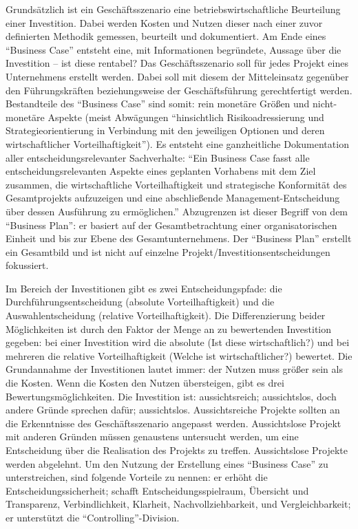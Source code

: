 Grundsätzlich ist ein Geschäftsszenario eine betriebswirtschaftliche Beurteilung einer Investition. Dabei werden Kosten und Nutzen dieser nach einer zuvor definierten Methodik gemessen, beurteilt und dokumentiert. Am Ende eines \enquote{Business Case} entsteht eine, mit Informationen begründete, Aussage über die Investition -- ist diese rentabel? Das Geschäftsszenario soll für jedes Projekt eines Unternehmens erstellt werden. Dabei soll mit diesem der Mitteleinsatz gegenüber den Führungskräften beziehungsweise der Geschäftsführung gerechtfertigt werden. Bestandteile des \enquote{Business Case} sind somit: rein monetäre Größen und nicht-monetäre Aspekte (meist Abwägungen \enquote{hinsichtlich Risikoadressierung und Strategieorientierung in Verbindung mit den jeweiligen Optionen und deren wirtschaftlicher Vorteilhaftigkeit}\autocite[][S.12]{brugger_it_2009}). Es entsteht eine ganzheitliche Dokumentation aller entscheidungsrelevanter Sachverhalte: \enquote{Ein Business Case fasst alle entscheidungsrelevanten Aspekte eines geplanten Vorhabens mit dem Ziel zusammen, die wirtschaftliche Vorteilhaftigkeit und strategische Konformität des Gesamtprojekts aufzuzeigen und eine abschließende Management-Entscheidung über dessen Ausführung zu ermöglichen.}\autocite[][S.13]{brugger_it_2009} Abzugrenzen ist dieser Begriff von dem \enquote{Business Plan}: er basiert auf der Gesamtbetrachtung einer organisatorischen Einheit und bis zur Ebene des Gesamtunternehmens. Der \enquote{Business Plan} erstellt ein Gesamtbild und ist nicht auf einzelne Projekt/Investitionsentscheidungen fokussiert. 
\par
Im Bereich der Investitionen gibt es zwei Entscheidungspfade: die Durchführungsentscheidung (absolute Vorteilhaftigkeit) und die Auswahlentscheidung (relative Vorteilhaftigkeit).\autocite[vgl.][S.14]{brugger_it_2009} Die Differenzierung beider Möglichkeiten ist durch den Faktor der Menge an zu bewertenden Investition gegeben: bei einer Investition wird die absolute (Ist diese wirtschaftlich?) und bei mehreren die relative Vorteilhaftigkeit (Welche ist wirtschaftlicher?) bewertet. Die Grundannahme der Investitionen lautet immer: der Nutzen muss größer sein als die Kosten. Wenn die Kosten den Nutzen übersteigen, gibt es drei Bewertungsmöglichkeiten. Die Investition ist: aussichtsreich; aussichtslos, doch andere Gründe sprechen dafür; aussichtslos. Aussichtsreiche Projekte sollten an die Erkenntnisse des Geschäftsszenario angepasst werden. Aussichtslose Projekt mit anderen Gründen müssen genaustens untersucht werden, um eine Entscheidung über die Realisation des Projekts zu treffen. Aussichtslose Projekte werden abgelehnt. Um den Nutzung der Erstellung eines \enquote{Business Case} zu unterstreichen, sind folgende Vorteile zu nennen: er erhöht die Entscheidungssicherheit; schafft Entscheidungsspielraum, Übersicht und Transparenz, Verbindlichkeit, Klarheit, Nachvollziehbarkeit, und Vergleichbarkeit; er unterstützt die \enquote{Controlling}-Division.\autocite[vgl.][S.17]{brugger_it_2009} \par
